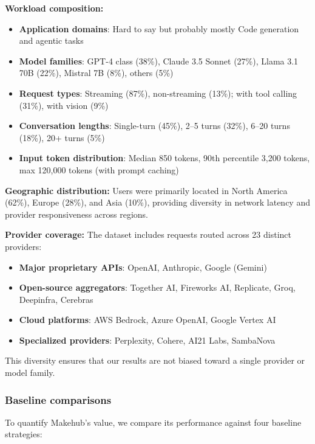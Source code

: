 \documentclass[english]{article}
\begin{document}
\noindent\textbf{Workload composition:}
\begin{itemize}
    \item \textbf{Application domains}: Hard to say but probably mostly Code generation and agentic tasks
    \item \textbf{Model families}: GPT-4 class (38\%), Claude 3.5 Sonnet (27\%), Llama 3.1 70B (22\%), Mistral 7B (8\%), others (5\%)
    \item \textbf{Request types}: Streaming (87\%), non-streaming (13\%); with tool calling (31\%), with vision (9\%)
    \item \textbf{Conversation lengths}: Single-turn (45\%), 2--5 turns (32\%), 6--20 turns (18\%), 20+ turns (5\%)
    \item \textbf{Input token distribution}: Median 850 tokens, 90th percentile 3,200 tokens, max 120,000 tokens (with prompt caching)
\end{itemize}

\medskip

\noindent\textbf{Geographic distribution:}
Users were primarily located in North America (62\%), Europe (28\%), and Asia (10\%), providing diversity in network latency and provider responsiveness across regions.

\medskip

\noindent\textbf{Provider coverage:}
The dataset includes requests routed across 23 distinct providers:
\begin{itemize}
    \item \textbf{Major proprietary APIs}: OpenAI, Anthropic, Google (Gemini)
    \item \textbf{Open-source aggregators}: Together AI, Fireworks AI, Replicate, Groq, Deepinfra, Cerebras
    \item \textbf{Cloud platforms}: AWS Bedrock, Azure OpenAI, Google Vertex AI
    \item \textbf{Specialized providers}: Perplexity, Cohere, AI21 Labs, SambaNova
\end{itemize}

This diversity ensures that our results are not biased toward a single provider or model family.

\subsubsection{Baseline comparisons}

To quantify Makehub's value, we compare its performance against four baseline strategies:
\end{document}
